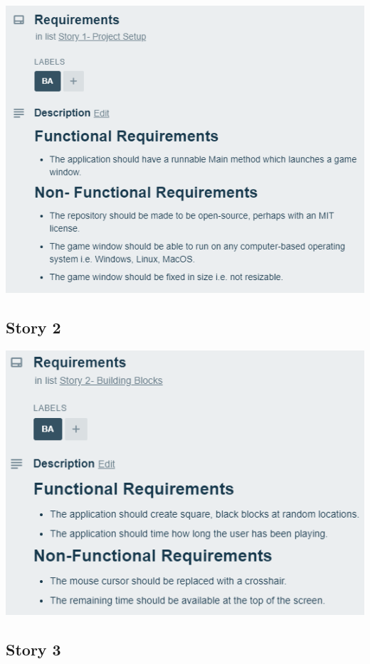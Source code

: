 \documentclass[12pt]{article}
\begin{document}
    \begin{center}
        \includegraphics[scale=0.9]{story1}
    \end{center}

\subsection{Story 2}

    \begin{center}
        \includegraphics[scale=0.8]{story2}
    \end{center}

\subsection{Story 3}
\end{document}
